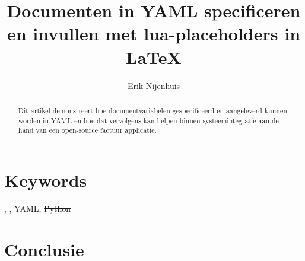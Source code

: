 \documentclass[dutch]{ltugboat}
\title{Documenten in YAML specificeren en invullen met lua-placeholders in LaTeX}
\author{Erik Nijenhuis}
\begin{document}
    \maketitle

    \begin{abstract}
        Dit artikel demonstreert hoe documentvariabelen gespecificeerd en aangeleverd kunnen worden in YAML en hoe dat vervolgens kan helpen binnen systeemintegratie aan de hand van een open-source factuur applicatie.
    \end{abstract}

    \section*{Keywords}
    \LuaTeX, \LuaLaTeX, YAML, \sout{Python}


    

    

    

    

    \section{Conclusie}


    \makesignature
\end{document}
